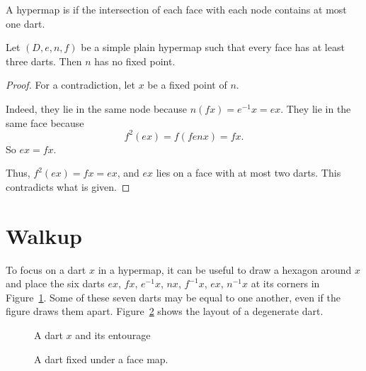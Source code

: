 \begin{definition}[simple] 
A hypermap is  if the intersection of each face with
each node contains at most one dart.  %
\end{definition}


\begin{lemma}\label{lemma:nondegen} 
Let $(D,e,n,f)$ be a simple plain hypermap such that every face has
at least three darts.
Then $n$ has no fixed point.
%
\end{lemma}

\begin{proof} For a contradiction, let $x$ be a fixed point of
$n$. 

  Indeed, they lie in the same node
because $n(f x) = e^{-1} x = e x$. They lie in the same face because
\begin{displaymath}f^2 (e x) = f (f e n x) = f x.\end{displaymath}
So $e x = f x$.

Thus, $f^2 (e x) = f x = e x$, and $e x$ lies on a
face with at most two darts.  This contradicts what is given.
\end{proof}




\section{Walkup}

To focus on a dart $x$ in a
hypermap, it can be useful to draw a hexagon around $x$ and place
the six darts $e x$,
$f x$, $e^{-1} x$, $n x$,  $f^{-1} x$, $e x$, $n^{-1} x$  at its corners
in Figure~\ref{fig:dart+}.  Some of these seven darts may be
equal to one another, even if the figure draws them apart.
Figure~\ref{fig:dart-fix} shows the layout of a degenerate dart.
%

\begin{figure}[htb]
\centering
{}
\caption{A dart $x$ and its entourage}
\label{fig:dart+}
\end{figure}

\begin{figure}[htb]
\centering
{}
\caption{A dart fixed under a face map.}
\label{fig:dart-fix}
\end{figure}

